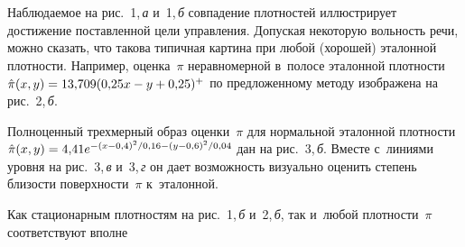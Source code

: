 \begin{multicols}{2}
  Наблюдаемое на рис.~1,\,\textit{а} и~1,\,\textit{б} совпадение плотностей 
иллюстрирует достижение по\-став\-лен\-ной цели управ\-ле\-ния. Допуская 
некоторую воль\-ность речи, можно сказать, что такова типичная картина при 
любой (хорошей) эталонной плот\-ности. Например, оценка~$\pi$ 
неравномерной в~полосе эталонной плот\-ности $\hat{\pi}(x,y)\hm= 13{,}709 
(0{,}25x \hm- y \hm+ 0{,}25)^+$ по предложенному методу изоб\-ра\-же\-на на 
рис.~2,\,\textit{б}. 
  

 
  Полноценный трехмерный образ оценки~$\pi$ для нормальной эталонной 
плот\-ности $\hat{\pi}(x,y) \hm= 4{,}41 e^{-(x-0{,}4)^2/0{,}16 - (y-0{,}6)^2/0{,}04}$ 
дан на рис.~3,\,\textit{б}. Вместе с~линиями уровня на 
рис.~3,\,\textit{в} и~3,\,\textit{г} он дает воз\-мож\-ность визуально оценить 
степень бли\-зости по\-верх\-ности~$\pi$ к~эталонной. 
  
  
  Как стационарным плотностям на рис.~1,\,\textit{б} и~2,\,\textit{б}, так 
и~любой плот\-ности~$\pi$ соответствуют вполне\linebreak\vspace*{-12pt}

\pagebreak

\end{multicols}

 \begin{figure*} %
  \vspace*{1pt}
  \begin{center}  
    \mbox{%
\epsfxsize=159.939mm
}
\end{center}
\vspace*{-9pt}
  \end{figure*}

